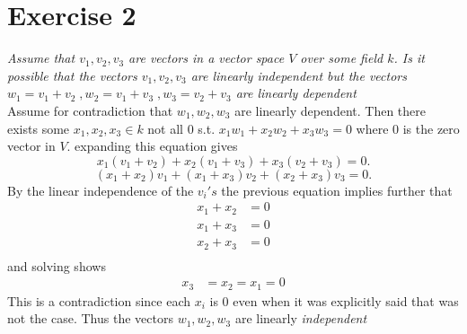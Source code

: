 \documentclass{article}
\begin{document}
    \section{Exercise 2}
    \emph{Assume that $v_1,v_2,v_3$ are vectors in a vector space $V$ over some field $k$.
        Is it possible that the vectors $v_1,v_2,v_3$ are linearly independent but the vectors
    $w_1 = v_1 + v_2 \;, w_2 = v_1+v_3 \;, w_3 = v_2 + v_3$ are linearly \emph{dependent}}\\
    Assume for contradiction that $w_1,w_2,w_3$ are linearly dependent. Then there exists some $x_1,x_2,x_3 \in k$ not all $0$ s.t.
    $x_1w_1+x_2w_2+x_3w_3 = 0$ where $0$ is the zero vector in $V$. expanding this equation gives
     \[
    x_1(v_1+v_2)+x_2(v_1+v_3)+x_3(v_2+v_3) = 0
    .\] 
    \[
        (x_1+x_2)v_1+(x_1+x_3)v_2+(x_2+x_3)v_3 = 0
    .\] 
    By the linear independence of the $v_i's$ the previous equation implies further that
    \begin{align*}
        x_1+x_2 &= 0\\
        x_1+x_3 &= 0\\
        x_2+x_3 &= 0\\
    \end{align*}
    and solving shows
    \begin{align*}
        x_3&=x_2=x_1=0
    \end{align*}
    This is a contradiction since each $x_i$ is 0 even when it was explicitly said that was not the case. Thus the vectors
    $w_1,w_2,w_3$ are linearly \emph{independent}
\end{document}
